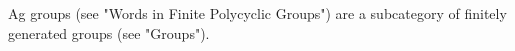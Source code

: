 %

Ag groups (see "Words in Finite Polycyclic Groups") are  a subcategory of
finitely generated groups (see "Groups").

